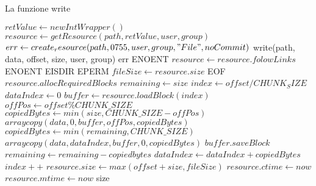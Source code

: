 \begin{algorithm}
\begin{algorithmic}[5]
\caption{La funzione write}
	\State $retValue \gets new IntWrapper()$
	\State $resource \gets getResource(path, retValue, user, group)$
		\State $err \gets create_resource(path, 0755, user, group, "File", noCommit)$
			\State \Return write(path, data, offset, size, user, group)
		\Else
			\State \Return err
		\EndIf
	\EndIf
		\State \Return ENOENT
	\EndIf
		\State $resource \gets resource.folowLinks$
	\EndIf
		\State \Return ENOENT
		\State \Return EISDIR
	\EndIf
		\State \Return EPERM
	\EndIf
	\State $fileSize \gets resource.size$
		\State \Return EOF
	\EndIf
	\State $resource.allocRequiredBlocks$
	\State $remaining \gets size$
	\State $index \gets offset / CHUNK_SIZE$
	\State $dataIndex \gets 0$
		\State $buffer \gets resource.loadBlock(index)$
			\State $offPos \gets offset \% CHUNK\_SIZE$
			\State $copiedBytes \gets min(size, CHUNK\_SIZE - offPos)$
			\State $arraycopy(data, 0, buffer, offPos, copiedBytes)$
		\Else
			\State $copiedBytes \gets min(remaining, CHUNK\_SIZE)$
			\State $arraycopy(data, dataIndex, buffer, 0, copiedBytes)$
		\EndIf
		\State $buffer.saveBlock$
		\State $remaining \gets remaining-copiedbytes$
		\State $dataIndex \gets dataIndex + copiedBytes$
		\State $index++$
	\EndWhile
	\State $resource.size \gets max(offset+size, fileSize)$
	\State $resource.ctime \gets now$
	\State $resource.mtime \gets now$
	\State \Return size
\EndFunction
\end{algorithmic}
\end{algorithm}

